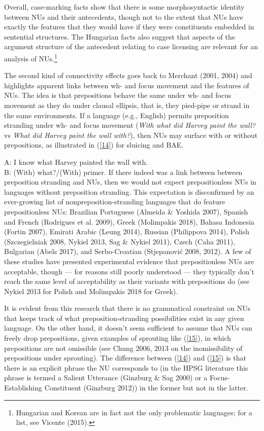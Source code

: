 \documentclass[output=paper
                ,modfonts
                ,nonflat
	        ,collection
	        ,collectionchapter
	        ,collectiontoclongg
 	        ,biblatex
                ,babelshorthands
                ,newtxmath
                ,draftmode
                ,colorlinks, citecolor=brown
]{./langsci/langscibook}
\begin{document}
{Overall, case-marking facts show that there is some morphosyntactic identity between NUs and their antecedents, though not to the extent that NUs have exactly the features that they would have if they were constituents embedded in sentential structures. The Hungarian facts also suggest that aspects of the argument structure of the antecedent relating to case licensing are relevant for an analysis of NUs.\footnote{Hungarian and Korean are in fact not the only problematic languages; for a list, see Vicente (2015).}

The second kind of connectivity effects goes back to Merchant (2001, 2004) and highlights apparent links between wh- and focus movement and the features of NUs. The idea is that prepositions behave the same under wh- and focus movement as they do under clausal ellipsis, that is, they pied-pipe or strand in the same environments. If a language (e.g., English) permits preposition stranding under wh- and focus movement ({\it With what did Harvey paint the wall?} vs {\it What did Harvey paint the wall with?}), then NUs may surface with or without prepositions, as illustrated in (\ref{14}) for sluicing and BAE.

\ea A: I know what Harvey painted the wall with.\\B: (With) what?/(With) primer.\label{14}\z
If there indeed was a link between between preposition stranding and NUs, then we would not expect prepositionless NUs in languages without preposition stranding. This expectation is disconfirmed by an ever-growing list of nonpreposition-stranding languages that do feature prepositionless NUs: Brazilian Portuguese (Almeida \& Yoshida 2007), Spanish and French (Rodrigues et al. 2009), Greek (Molimpakis 2018), Bahasa Indonesia (Fortin 2007), Emirati Arabic (Leung 2014), Russian (Philippova 2014), Polish (Szczegielniak 2008, Nykiel 2013, Sag \& Nykiel 2011), Czech (Caha 2011), Bulgarian (Abels 2017), and Serbo-Croatian (Stjepanovi\'{c} 2008, 2012). A few of these studies have presented experimental evidence that prepositionless NUs are acceptable, though --- for reasons still poorly understood --- they typically don't reach the same level of acceptability as their variants with prepositions do (see Nykiel 2013 for Polish and Molimpakis 2018 for Greek).

 It is evident from this research that there is no grammatical constraint on NUs that keeps track of what preposition-stranding possibilities exist in any given language. On the other hand, it doesn't seem sufficient to assume that NUs can freely drop prepositions, given examples of sprouting like (\ref{15}), in which prepositions are not omissible (see Chung 2006, 2013 on the inomissibility of prepositions under sprouting). The difference between (\ref{14}) and (\ref{15}) is that there is an explicit phrase the NU corresponds to (in the HPSG literature this phrase is termed a Salient Utterance (Ginzburg \& Sag 2000) or a Focus-Establishing Constituent (Ginzburg 2012)) in the former but not in the latter.

}
\end{document}
